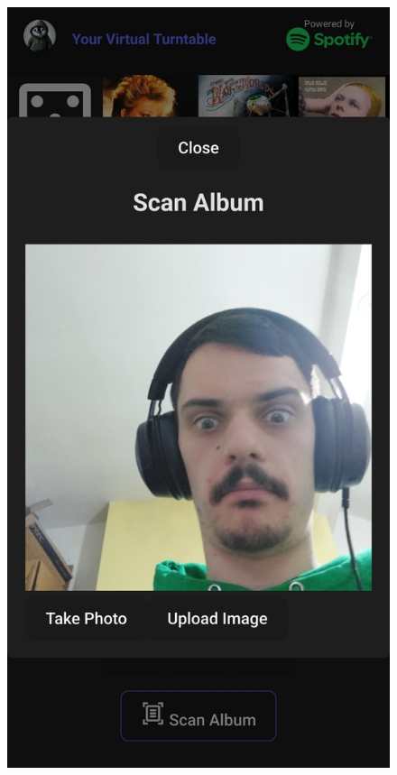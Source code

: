 \begin{uomappendix}
            \begin{figure}[H]
                \centering
                \begin{minipage}[b]{0.45\textwidth}
                    \centering
                    \includegraphics[width=\textwidth]{images/screenshots/PHONE_Cam.jpg}

\end{minipage}
\end{figure}
\end{uomappendix}

